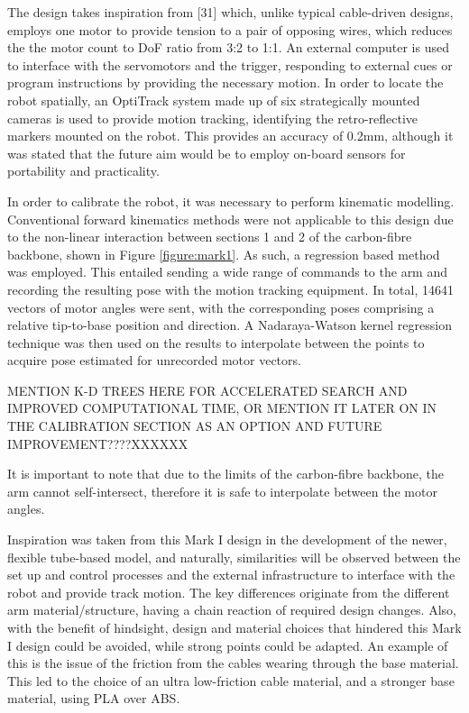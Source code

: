 \documentclass[11pt]{article}
\begin{document}
The design takes inspiration from [31] which, unlike typical cable-driven designs, employs one motor
to provide tension to a pair of opposing wires, which reduces the the motor count to DoF ratio from 3:2 to 1:1. 
An external computer is used to interface with the servomotors and the trigger, responding to external
cues or program instructions by providing the necessary motion. In order to locate the robot spatially, an OptiTrack system made up of six strategically mounted cameras is
used to provide motion tracking, identifying the retro-reflective markers mounted on the robot. This
provides an accuracy of 0.2mm, although it was stated that the future aim would be to employ
on-board sensors for portability and practicality.


In order to calibrate the robot, it was necessary to perform kinematic modelling. Conventional forward
kinematics methods were not applicable to this design due to the non-linear interaction between sections 1 and 2
of the carbon-fibre backbone, shown in Figure \ref{figure:mark1}. As such, a regression based method was employed.
This entailed sending a wide range of commands to the arm and recording the resulting pose with the
motion tracking equipment. In total, 14641 vectors of motor angles were sent, with the corresponding
poses comprising a relative tip-to-base position and direction. A Nadaraya-Watson kernel regression technique
was then used on the results to interpolate between the points to acquire pose estimated for unrecorded
motor vectors. 

MENTION K-D TREES HERE FOR ACCELERATED SEARCH AND IMPROVED COMPUTATIONAL TIME, OR MENTION IT LATER ON IN THE CALIBRATION SECTION AS AN OPTION AND FUTURE IMPROVEMENT????XXXXXX


It is important to note that due to the limits
of the carbon-fibre backbone, the arm cannot self-intersect, therefore it is safe to interpolate
between the motor angles.

Inspiration was taken from this Mark I design in the development of the newer, flexible tube-based model, and naturally, similarities will be observed between the set up and control processes and the external infrastructure to interface with the robot and provide track motion. The key differences originate from the different arm material/structure, having a chain reaction of required design changes. Also, with the benefit of hindsight, design and material choices that hindered this Mark I design could be avoided, while strong points could be adapted. An example of this is the issue of the friction from the cables wearing through the base material. This led to the choice of an ultra low-friction cable material, and a stronger base material, using PLA over ABS. 
\end{document}

